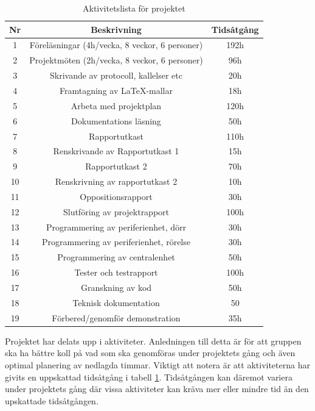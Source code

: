 \documentclass[a4paper]{article}
\begin{document}
\begin{table}[H]
    \begin{center}
        \begin{tabular}{ |c|c|c| }\hline
            Nr & Beskrivning & Tidsåtgång \\\hline\hline
            1 & Föreläsningar (4h/vecka, 8 veckor, 6 personer) & 192h \\\hline
            2 & Projektmöten (2h/vecka, 8 veckor, 6 personer) & 96h \\\hline
            3 & Skrivande av protocoll, kallelser etc & 20h \\\hline
            4 & Framtagning av LaTeX-mallar & 18h \\\hline
            5 & Arbeta med projektplan & 120h \\\hline
            6 & Dokumentations läsning & 50h \\\hline
            7 & Rapportutkast & 110h \\\hline
            8 & Renskrivande av Rapportutkast 1 & 15h \\\hline
            9 & Rapportutkast 2 & 70h\\\hline
            10 & Renskrivning av rapportutkast 2 & 10h \\\hline
            11 & Oppositionsrapport & 30h\\\hline
            12 & Slutföring av projektrapport & 100h\\\hline
            13 & Programmering av periferienhet, dörr & 30h \\\hline
            14 & Programmering av periferienhet, rörelse & 30h \\\hline
            15 & Programmering av centralenhet & 50h \\\hline
            16 & Tester och testrapport & 100h\\\hline
            17 & Granskning av kod & 50h \\\hline
            18 & Teknisk dokumentation & 50 \\\hline
            19 & Förbered/genomför demonstration & 35h \\\hline
        \end{tabular}
        \caption{Aktivitetslista för projektet}
        \label{table:aktivitetslista}
    \end{center}
\end{table}

Projektet har delats upp i aktiviteter. Anledningen till detta är för att gruppen ska ha bättre koll på vad som ska genomföras under projektets gång och även optimal planering av nedlagda timmar. Viktigt att notera är att aktiviteterna har givits en uppskattad tidsåtgång i tabell \ref{table:aktivitetslista}. Tidsåtgången kan däremot variera under projektets gång där vissa aktiviteter kan kräva mer eller mindre tid än den upskattade tidsåtgången.
\end{document}
